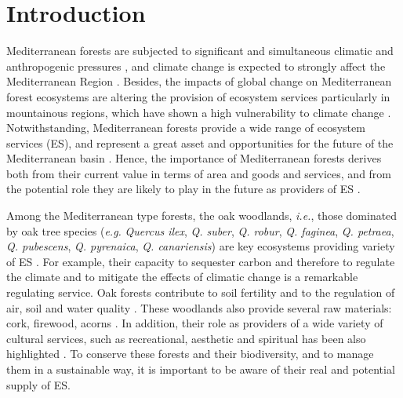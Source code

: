 \section{Introduction}\label{sec:es:intro}

Mediterranean forests are subjected to significant and simultaneous climatic and anthropogenic pressures \autocite{FAOPlanBleu2018StateMediterranean,DoblasMirandaetal2017ReviewCombination}, and climate change is expected to strongly affect the Mediterranean Region \autocite{GiorgiLionello2008ClimateChange,Crameretal2018ClimateChange,Crameretal2020ClimateEnvironmental}. Besides, the impacts of global change on Mediterranean forest ecosystems are altering the provision of ecosystem services \autocite{Lindneretal2010ClimateChange,Lindneretal2014ClimateChange,NoceSantini2018MediterraneanForest,Penuelasetal2017ImpactsGlobal,SerradaHierroetal2011ImpactosVulnerabilidad} particularly in mountainous regions, which have shown a high vulnerability to climate change \autocite{Schroteretal2005EcosystemService}. Notwithstanding, Mediterranean forests provide a wide range of ecosystem services (ES), and represent a great asset and opportunities for the future of the Mediterranean basin \autocite{Gauquelinetal2018MediterraneanForests,NoceSantini2018MediterraneanForest}. Hence, the importance of Mediterranean forests derives both from their current value in terms of area and goods and services, and from the potential role they are likely to play in the future as providers of ES \autocites{FAOPlanBleu2018StateMediterranean}.

Among the Mediterranean type forests, the oak woodlands, \emph{i.e.}, those dominated by oak tree species (\emph{e.g.} \emph{Quercus ilex}, \emph{Q. suber}, \emph{Q. robur}, \emph{Q. faginea}, \emph{Q. petraea}, \emph{Q. pubescens}, \emph{Q. pyrenaica}, \emph{Q. canariensis}) are key ecosystems providing variety of ES \autocite{Maranonetal2020IberianOaks}. For example, their capacity to sequester carbon and therefore to regulate the climate and to mitigate the effects of climatic change is a remarkable regulating service. Oak forests contribute to soil fertility and to the regulation of air, soil and water quality \autocite{Maranonetal2012EstadoTendencia}. These woodlands also provide several raw materials: cork, firewood, acorns \autocite{Bugalhoetal2011MediterraneanCork}. In addition, their role as providers of a wide variety of cultural services, such as recreational, aesthetic and spiritual has been also highlighted \autocite{Lofetal2016ManagementOak}. To conserve these forests and their biodiversity, and to manage them in a sustainable way, it is important to be aware of their real and potential supply of ES.

